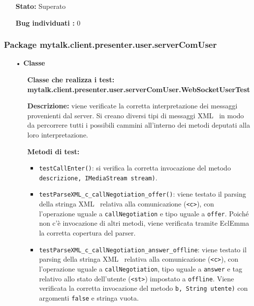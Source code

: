 {\begin{sloppypar}
{{\begin{itemize}
\begin{itemize}
					\item[] \textbf{Stato:} Superato
					\item[] \textbf{Bug individuati :} 0
					
				\end{itemize}
			\end{itemize}
			}
			
		\subsubsection{Package mytalk.client.presenter.user.serverComUser} {

			\begin{itemize}
				\item[•]\textbf{Classe }
				\begin{itemize}
					\item[] \textbf{Classe che realizza i test:\\mytalk.client.presenter.user.serverComUser.WebSocketUserTest}
					
					\item[] \textbf{Descrizione:} viene verificate la corretta interpretazione dei messaggi provenienti dal server. Si creano diversi tipi di messaggi XML\g~ in modo da percorrere tutti i possibili cammini all'interno dei metodi deputati alla loro interpretazione.

					\item[] \textbf{Metodi di test:}

					\begin{itemize}
						\item \texttt{testCallEnter()}: si verifica la corretta invocazione del metodo  \texttt{descrizione, IMediaStream stream)}.
						
						\item \texttt{testParseXML\_c\_callNegotiation\_offer()}: viene testato il parsing della stringa XML\g~ relativa alla comunicazione (\texttt{<c>}), con l'operazione uguale a \texttt{callNegotiation} e tipo uguale a \texttt{offer}. Poiché non c'è invocazione di altri metodi, viene verificata tramite EclEmma la corretta copertura del parser.
						
						\item \texttt{testParseXML\_c\_callNegotiation\_answer\_offline}: viene testato il parsing della stringa XML\g~ relativa alla comunicazione (\texttt{<c>}), con l'operazione uguale a \texttt{callNegotiation}, tipo uguale a \texttt{answer} e tag relativo allo stato dell'utente (\texttt{<st>}) impostato a \texttt{offline}. Viene verificata la corretta invocazione del metodo  \texttt{b, String utente)} con argomenti \texttt{false} e stringa vuota.
						

\end{itemize}
\end{itemize}
\end{itemize}}}
\end{sloppypar}}
